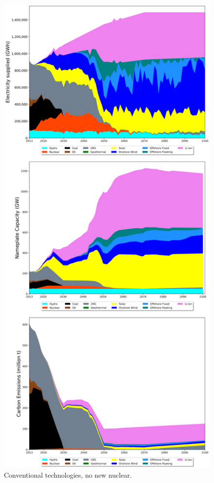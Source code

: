 \begin{figure}[htb] 
\centering
\vspace*{-3cm}
\includegraphics[scale=0.42]{figures/conv_nonuc}
\caption{Conventional technologies, no new nuclear.}
\label{scen1}
\end{figure}

